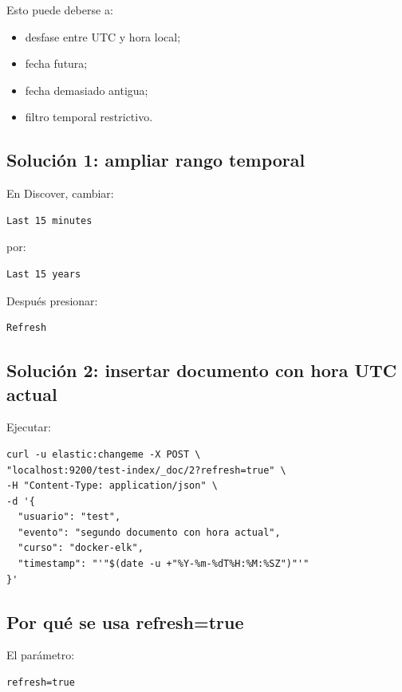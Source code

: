 \documentclass[
  coursetitle={Cómputo Nube y Tecnologías Emergentes},
  coursehours={96},
  coursedate={Verano 2026},
  doctype={Práctica},
  otherlangs={english,french},
  authorname={Lázaro},
  authorsurname={Bustio-Martínez},
  authortitle={PhD},
  role={Profesor Investigador},
  email={lbustio@inaoe.mx},
  phone={5559504000},
  ext={7459},
  institution={Instituto Nacional de Astrofísica, Óptica y Electrónica (INAOE)},
  department={Maestría en Ciencias en Tecnologías de Seguridad},
  address={Luis Enrique Erro 1, Sta. Ma. Tonantzintla, San Andrés Cholula, CP 72840, Puebla, México},
  margin={0.5in}
]{../../lbustio_lecture_notes}
\begin{document}
Esto puede deberse a:

\begin{itemize}
    \item desfase entre UTC y hora local;
    \item fecha futura;
    \item fecha demasiado antigua;
    \item filtro temporal restrictivo.
\end{itemize}

\subsection{Solución 1: ampliar rango temporal}

En Discover, cambiar:

\begin{verbatim}
Last 15 minutes
\end{verbatim}

por:

\begin{verbatim}
Last 15 years
\end{verbatim}

Después presionar:

\begin{verbatim}
Refresh
\end{verbatim}

\subsection{Solución 2: insertar documento con hora UTC actual}

Ejecutar:

\begin{lstlisting}
curl -u elastic:changeme -X POST \
"localhost:9200/test-index/_doc/2?refresh=true" \
-H "Content-Type: application/json" \
-d '{
  "usuario": "test",
  "evento": "segundo documento con hora actual",
  "curso": "docker-elk",
  "timestamp": "'"$(date -u +"%Y-%m-%dT%H:%M:%SZ")"'"
}'
\end{lstlisting}

\subsection{Por qué se usa refresh=true}

El parámetro:

\begin{verbatim}
refresh=true
\end{verbatim}
\end{document}
